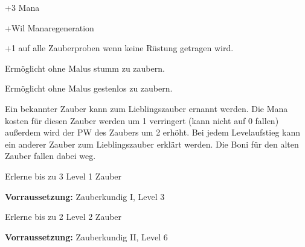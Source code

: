 \documentclass[../../Heldenanleitung2]{subfiles}
\begin{document}
\begin{multicols}{2}

\begin{tcolorbox}[title={Magisches Reservoir},colbacktitle=blue, coltitle=white]    
   +3 Mana
\end{tcolorbox}

\begin{tcolorbox}[title={Schnelle magische Erholung},colbacktitle=blue, coltitle=white]    
   +Wil Manaregeneration
\end{tcolorbox}

\begin{tcolorbox}[title={leichte Magie},colbacktitle=blue, coltitle=white]    
   +1 auf alle Zauberproben wenn keine Rüstung getragen wird.
\end{tcolorbox}

\begin{tcolorbox}[title={Stummes Zaubern},colbacktitle=blue, coltitle=white]    
   Ermöglicht ohne Malus stumm zu zaubern.
\end{tcolorbox}

\begin{tcolorbox}[title={Gestenloses Zaubern},colbacktitle=blue, coltitle=white]    
   Ermöglicht ohne Malus gestenlos zu zaubern.
\end{tcolorbox}

\begin{tcolorbox}[title={Lieblingszauber},colbacktitle=blue, coltitle=white]    
   Ein bekannter Zauber kann zum Lieblingszauber ernannt werden. Die Mana kosten für diesen Zauber werden um 1 verringert (kann nicht auf 0 fallen) außerdem wird der PW des Zaubers um 2 erhöht. Bei jedem Levelaufstieg kann ein anderer Zauber zum Lieblingszauber erklärt werden. Die Boni für den alten Zauber fallen dabei weg.
\end{tcolorbox}

\begin{tcolorbox}[title={Zauberkundig I},colbacktitle=blue, coltitle=white]    
   Erlerne bis zu 3 Level 1 Zauber
\end{tcolorbox}

\begin{tcolorbox}[title={Zauberkundig II},colbacktitle=blue, coltitle=white]
	\textbf{Vorraussetzung:} Zauberkundig I, Level 3
	\vspace{0.2cm}
	
   Erlerne bis zu 2 Level 2 Zauber
\end{tcolorbox}

\begin{tcolorbox}[title={Zauberkundig III},colbacktitle=blue, coltitle=white]
	\textbf{Vorraussetzung:} Zauberkundig II, Level 6
	\vspace{0.2cm}
	

\end{tcolorbox}
\end{multicols}
\end{document}
